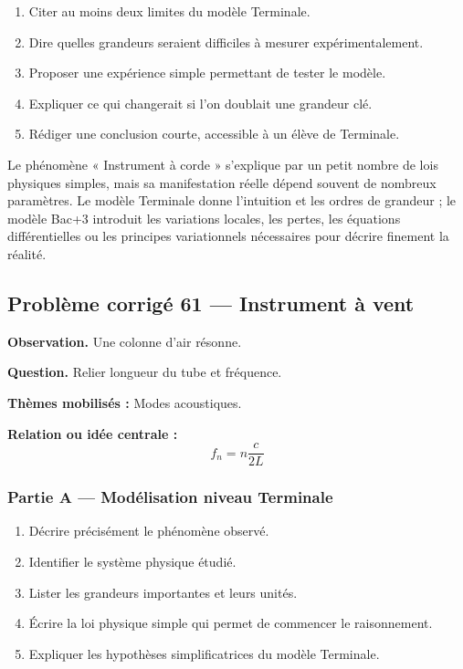 \documentclass[11pt,a4paper]{article}
\begin{document}
\begin{enumerate}
  \item Citer au moins deux limites du modèle Terminale.
  \item Dire quelles grandeurs seraient difficiles à mesurer expérimentalement.
  \item Proposer une expérience simple permettant de tester le modèle.
  \item Expliquer ce qui changerait si l'on doublait une grandeur clé.
  \item Rédiger une conclusion courte, accessible à un élève de Terminale.
\end{enumerate}

\begin{corrigebox}
Le phénomène « Instrument à corde » s'explique par un petit nombre de lois physiques simples, mais sa manifestation réelle dépend souvent de nombreux paramètres. Le modèle Terminale donne l'intuition et les ordres de grandeur ; le modèle Bac+3 introduit les variations locales, les pertes, les équations différentielles ou les principes variationnels nécessaires pour décrire finement la réalité.
\end{corrigebox}

\subsection{Problème corrigé 61 — Instrument à vent}

\begin{exercicebox}
\textbf{Observation.} Une colonne d'air résonne.

\medskip
\textbf{Question.} Relier longueur du tube et fréquence.

\medskip
\textbf{Thèmes mobilisés :} Modes acoustiques.

\medskip
\textbf{Relation ou idée centrale :}
\[
f_n=n\frac{c}{2L}
\]
\end{exercicebox}

\subsubsection*{Partie A — Modélisation niveau Terminale}

\begin{enumerate}
  \item Décrire précisément le phénomène observé.
  \item Identifier le système physique étudié.
  \item Lister les grandeurs importantes et leurs unités.
  \item Écrire la loi physique simple qui permet de commencer le raisonnement.
  \item Expliquer les hypothèses simplificatrices du modèle Terminale.
\end{enumerate}
\end{document}
